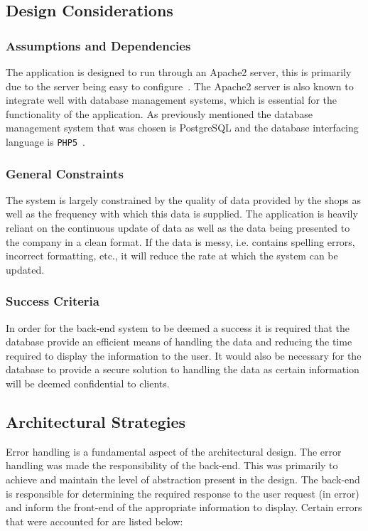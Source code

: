\documentclass[10pt,twocolumn]{witseiepaper}
\begin{document}
	\subsection{Design Considerations}
	
		\subsubsection{Assumptions and Dependencies}
		
			The application is designed to run through an Apache2 server, this is primarily due to the server being easy to configure~\cite{apache}. The Apache2 server is also known to integrate well with database management systems, which is essential for the functionality of the application. As previously mentioned the database management system that was chosen is PostgreSQL and the database interfacing language is \texttt{PHP5}~\cite{php}.
			
		\subsubsection{General Constraints}
			
			The system is largely constrained by the quality of data provided by the shops as well as the frequency with which this data is supplied. The application is heavily reliant on the continuous update of data as well as the data being presented to the company in a clean format. If the data is messy, i.e. contains spelling errors, incorrect formatting, etc., it will reduce the rate at which the system can be updated.
			
		\subsubsection{Success Criteria}
	
			In order for the back-end system to be deemed a success it is required that the database provide an efficient means of handling the data and reducing the time required to display the information to the user. It would also be necessary for the database to provide a secure solution to handling the data as certain information will be deemed confidential to clients.
	
	\subsection{Architectural Strategies}
	
		Error handling is a fundamental aspect of the architectural design. The error handling was made the responsibility of the back-end. This was primarily to achieve and maintain the level of abstraction present in the design. The back-end is responsible for determining the required response to the user request (in error) and inform the front-end of the appropriate information to display. Certain errors that were accounted for are listed below:
		
\end{document}
